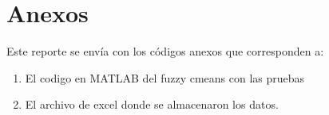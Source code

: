 \documentclass[11pt, letterpaper]{article}
\begin{document}

\newpage

\section{Anexos}

Este reporte se envía con los códigos anexos que corresponden a:

\begin{enumerate}
	\item El codigo en MATLAB del fuzzy cmeans con las pruebas
	\item El archivo de excel donde se almacenaron los datos.

\end{enumerate}
\end{document}
